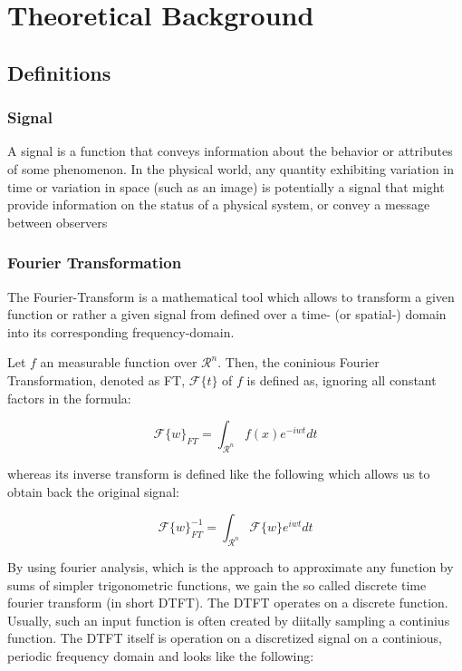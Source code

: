 \section{Theoretical Background}
\subsection{Definitions}

\subsubsection{Signal}
A signal is a function that conveys information about the behavior or attributes of some phenomenon.
In the physical world, any quantity exhibiting variation in time or variation in space (such as an image) is potentially a signal that might provide information on the status of a physical system, or convey a message between observers

\subsubsection{Fourier Transformation}
The Fourier-Transform is a mathematical tool which allows to transform a given function or rather a given signal from defined over a time- (or spatial-) domain into its corresponding frequency-domain.
 
Let $f$ an measurable function over $\mathcal{R}^n$. Then, the coninious Fourier Transformation, denoted as FT, $\mathcal{F}\{t\}$ of $f$ is defined as, ignoring all constant factors in the formula:
 
\begin{equation}
  \mathcal{F}\{w\}_{FT} = \int_{\mathcal{R}^n} f(x)e^{-iwt} dt
\end{equation}

whereas its inverse transform is defined like the following which allows us to obtain back the original signal:

\begin{equation}
  \mathcal{F}\{w\}^{-1}_{FT} = \int_{\mathcal{R}^n} \mathcal{F}\{w\}e^{iwt} dt
\end{equation}

By using fourier analysis, which is the approach to approximate any function by sums of simpler trigonometric functions, we gain the so called discrete time fourier transform (in short DTFT). The DTFT operates on a discrete function. Usually, such an input function is often created by diitally sampling a continius function. The DTFT itself is operation on a discretized signal on a continious, periodic frequency domain and looks like the following:

